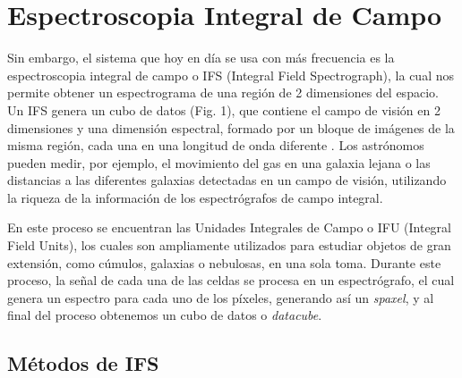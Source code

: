 \documentclass[9pt,twocolumn,a4paper]{opticajnl}
\begin{document}
\section*{Espectroscopia Integral de Campo}
Sin embargo, el sistema que hoy en día se usa con más frecuencia es la espectroscopia integral de campo o IFS (Integral Field Spectrograph), la cual nos permite obtener un espectrograma de una región de 2 dimensiones del espacio. Un IFS genera un cubo de datos (Fig. 1), que contiene el campo de visión en 2 dimensiones y una dimensión espectral, formado por un bloque de imágenes de la misma región, cada una en una longitud de onda diferente \cite{UW-Madison-IFS}. Los astrónomos pueden medir, por ejemplo, el movimiento del gas en una galaxia lejana o las distancias a las diferentes galaxias detectadas en un campo de visión, utilizando la riqueza de la información de los espectrógrafos de campo integral.

En este proceso se encuentran las Unidades Integrales de Campo o IFU (Integral Field Units), los cuales son ampliamente utilizados para estudiar objetos de gran extensión, como cúmulos, galaxias o nebulosas, en una sola toma. Durante este proceso, la señal de cada una de las celdas se procesa en un espectrógrafo, el cual genera un espectro para cada uno de los píxeles, generando así un \textit{spaxel}, y al final del proceso obtenemos un cubo de datos o \textit{datacube}.

\subsection*{Métodos de IFS}
\end{document}
